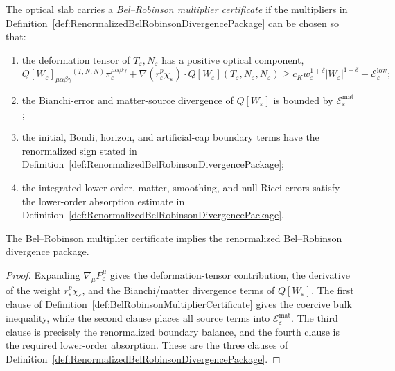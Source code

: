 \begin{definition}\label{def:BelRobinsonMultiplierCertificate}
The optical slab carries a \emph{Bel--Robinson multiplier certificate} if the multipliers in Definition~\ref{def:RenormalizedBelRobinsonDivergencePackage} can be chosen so that:
\begin{enumerate}
    \item the deformation tensor of $T_\varepsilon,N_\varepsilon$ has a positive optical component,
    \[
        Q[W_\varepsilon]_{\mu\alpha\beta\gamma}
        {}^{(T,N,N)}\pi_\varepsilon^{\mu\alpha\beta\gamma}
        +
        \nabla(r_\varepsilon^p\chi_\varepsilon)\cdot Q[W_\varepsilon](T_\varepsilon,N_\varepsilon,N_\varepsilon)
        \ge
        c_K w_\varepsilon^{1+\delta}|W_\varepsilon|^{1+\delta}
        -\mathcal E_{\varepsilon}^{\mathrm{low}};
    \]
    \item the Bianchi-error and matter-source divergence of $Q[W_\varepsilon]$ is bounded by $\mathcal E_{\varepsilon}^{\mathrm{mat}}$;
    \item the initial, Bondi, horizon, and artificial-cap boundary terms have the renormalized sign stated in Definition~\ref{def:RenormalizedBelRobinsonDivergencePackage};
    \item the integrated lower-order, matter, smoothing, and null-Ricci errors satisfy the lower-order absorption estimate in Definition~\ref{def:RenormalizedBelRobinsonDivergencePackage}.
\end{enumerate}
\end{definition}

\begin{proposition}\label{prop:BelRobinsonCertificateGate}
The Bel--Robinson multiplier certificate implies the renormalized Bel--Robinson divergence package.
\end{proposition}

\begin{proof}
Expanding $\nabla_\mu P_\varepsilon^\mu$ gives the deformation-tensor contribution, the derivative of the weight $r_\varepsilon^p\chi_\varepsilon$, and the Bianchi/matter divergence terms of $Q[W_\varepsilon]$. The first clause of Definition~\ref{def:BelRobinsonMultiplierCertificate} gives the coercive bulk inequality, while the second clause places all source terms into $\mathcal E_{\varepsilon}^{\mathrm{mat}}$. The third clause is precisely the renormalized boundary balance, and the fourth clause is the required lower-order absorption. These are the three clauses of Definition~\ref{def:RenormalizedBelRobinsonDivergencePackage}.
\end{proof}

